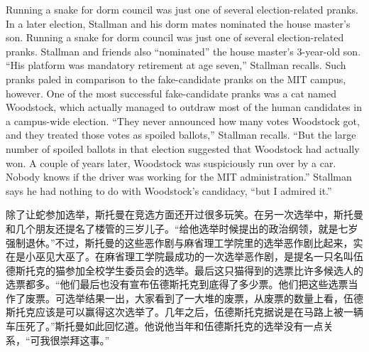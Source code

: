 \ifdefined\eng
\ifdefined\vone
Running a snake for dorm council was just one of several election-related pranks. In a later election, Stallman and his dorm mates nominated the house master's son. 
\fi
\ifdefined\vtwo
Running a snake for dorm council was just one of several election-related pranks. Stallman and friends also ``nominated'' the house master's 3-year-old son.
\fi
``His platform was mandatory retirement at age seven,'' Stallman recalls. Such pranks paled in comparison to the fake-candidate pranks on the MIT campus, however. One of the most successful fake-candidate pranks was a cat named Woodstock, which actually managed to outdraw most of the human candidates in a campus-wide election. ``They never announced how many votes Woodstock got, and they treated those votes as spoiled ballots,'' Stallman recalls. ``But the large number of spoiled ballots in that election suggested that Woodstock had actually won. A couple of years later, Woodstock was suspiciously run over by a car. Nobody knows if the driver was working for the MIT administration.'' Stallman says he had nothing to do with Woodstock's candidacy, ``but I admired it.''
\fi

\ifdefined\chs
除了让蛇参加选举，斯托曼在竞选方面还开过很多玩笑。在另一次选举中，斯托曼和几个朋友还提名了楼管的三岁儿子。``给他选举时候提出的政治纲领，就是七岁强制退休。''不过，斯托曼的这些恶作剧与麻省理工学院里的选举恶作剧比起来，实在是小巫见大巫了。在麻省理工学院最成功的一次选举恶作剧，是提名一只名叫伍德斯托克的猫参加全校学生委员会的选举。最后这只猫得到的选票比许多候选人的选票都多。``他们最后也没有宣布伍德斯托克到底得了多少票。他们把这些选票当作了废票。可选举结果一出，大家看到了一大堆的废票，从废票的数量上看，伍德斯托克应该是可以赢得这次选举了。几年之后，伍德斯托克据说是在马路上被一辆车压死了。''斯托曼如此回忆道。他说他当年和伍德斯托克的选举没有一点关系，``可我很崇拜这事。''
\fi

